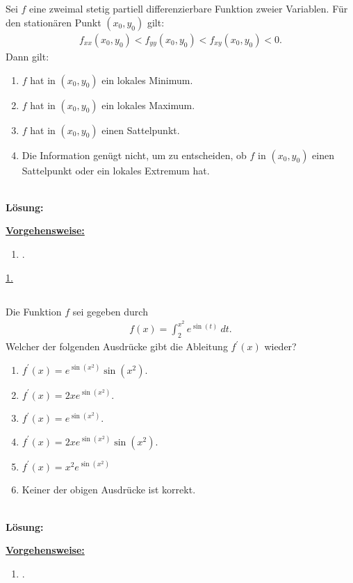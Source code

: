 \subsection*{}
Sei $ f $ eine zweimal stetig partiell differenzierbare Funktion zweier Variablen. Für den stationären Punkt $ (x_0,y_0) $ gilt:
\begin{align*}
	f_{xx}(x_0,y_0) < f_{yy}(x_0,y_0) < f_{xy}(x_0,y_0) < 0.
\end{align*} 
Dann gilt:
\renewcommand{\labelenumi}{(\alph{enumi})}
\begin{enumerate}
	\item $ f $ hat in $ (x_0,y_0) $ ein lokales Minimum.
	\item $ f $ hat in $ (x_0,y_0) $ ein lokales Maximum.
	\item $ f $ hat in $ (x_0,y_0) $ einen Sattelpunkt.
	\item Die Information genügt nicht, um zu entscheiden, ob $ f $ in $ (x_0,y_0) $ einen Sattelpunkt oder ein lokales Extremum hat.
\end{enumerate}
\ \\
\textbf{Lösung:}
\begin{mdframed}
	\underline{\textbf{Vorgehensweise:}}
	\renewcommand{\labelenumi}{\theenumi.}
	\begin{enumerate}
		\item .
	\end{enumerate}
\end{mdframed}
\underline{1. }\\
\newpage
\subsection*{}
Die Funktion $ f $ sei gegeben durch
\begin{align*}
	f(x) = \int_2^{x^2} e^{\sin(t)} \ dt.
\end{align*}
Welcher der folgenden Ausdrücke gibt die Ableitung $ f^\prime(x) $ wieder?
\renewcommand{\labelenumi}{(\alph{enumi})}
\begin{enumerate}
	\item 
	$ f^\prime(x) = e^{\sin(x^2)} \sin(x^2)$.
	\item 
	$ f^\prime(x) = 2 x e^{\sin(x^2)}$.
	\item 
	$ f^\prime(x) = e^{\sin(x^2)}$.
	\item
	$ f^\prime(x) = 2 x e^{\sin(x^2)} \sin(x^2)$.
	\item 
	$ f^\prime(x) = x^2 e^{\sin(x^2)}$ 
	\item 
	Keiner der obigen Ausdrücke ist korrekt.
\end{enumerate}
\ \\
\textbf{Lösung:}
\begin{mdframed}
\underline{\textbf{Vorgehensweise:}}
\renewcommand{\labelenumi}{\theenumi.}
\begin{enumerate}
\item .
\end{enumerate}
\end{mdframed}

